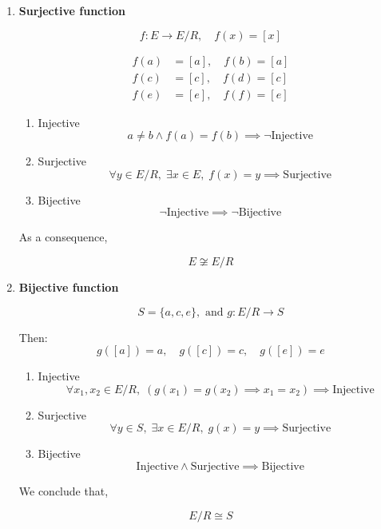 \documentclass[12pt,a4paper,openany]{article}
\begin{document}
\begin{enumerate}
\item \textbf{Surjective function}

   \[
   f: E \to E/R, \quad f(x) = [x]
   \]

   \[
   \begin{aligned}
   f(a) &= [a], \quad f(b) = [a] \\
   f(c) &= [c], \quad f(d) = [c] \\
   f(e) &= [e], \quad f(f) = [e]
   \end{aligned}
   \]

   \begin{enumerate}
   \item Injective
   \[
   a \neq b \wedge f(a) = f(b) \implies \neg \text{Injective}
   \]

   \item Surjective
   \[
   \forall y \in E/R, \; \exists x \in E, \; f(x) = y \implies \text{Surjective}
   \]

   \item Bijective
   \[
   \neg \text{Injective} \implies \neg \text{Bijective}
   \]
   \end{enumerate}

   As a consequence, 

   \[
   E \not\cong E/R
   \]

\item \textbf{Bijective function}

   \[
   S = \{a, c, e\}, \text{ and } g: E/R \to S
   \]

   Then: 
   \[
   g([a]) = a, \quad g([c]) = c, \quad g([e]) = e
   \]

   \begin{enumerate}
   \item Injective
   \[
   \forall x_1, x_2 \in E/R, \; (g(x_1) = g(x_2) \implies x_1 = x_2) \implies \text{Injective}
   \]

   \item Surjective
   \[
   \forall y \in S, \; \exists x \in E/R, \; g(x) = y \implies \text{Surjective}
   \]

   \item Bijective
   \[
   \text{Injective} \wedge \text{Surjective} \implies \text{Bijective}
   \]
   \end{enumerate}

   We conclude that,

   \[
   E/R \cong S
   \]
\end{enumerate}
\end{document}
